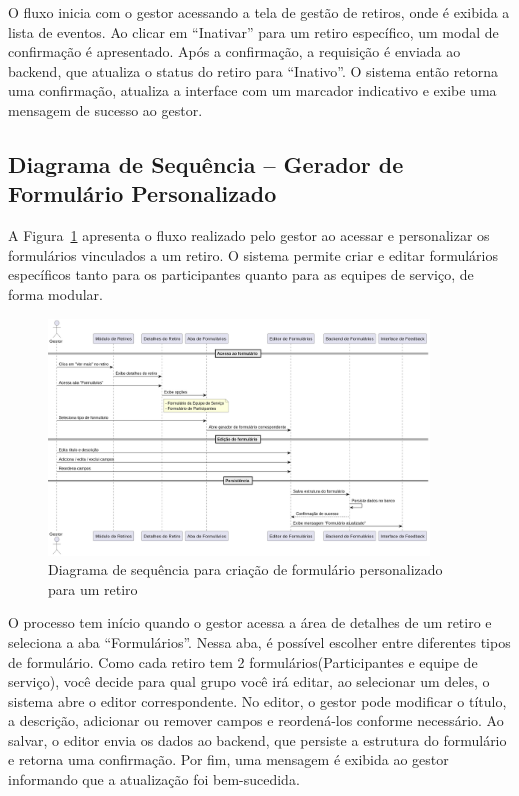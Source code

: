 O fluxo inicia com o gestor acessando a tela de gestão de retiros, onde é exibida a lista de eventos. Ao clicar em “Inativar” para um retiro específico, um modal de confirmação é apresentado. Após a confirmação, a requisição é enviada ao backend, que atualiza o status do retiro para “Inativo”. O sistema então retorna uma confirmação, atualiza a interface com um marcador indicativo e exibe uma mensagem de sucesso ao gestor.

\subsection{Diagrama de Sequência – Gerador de Formulário Personalizado}

A Figura~\ref{fig:retreatFormCreate} apresenta o fluxo realizado pelo gestor ao acessar e personalizar os formulários vinculados a um retiro. O sistema permite criar e editar formulários específicos tanto para os participantes quanto para as equipes de serviço, de forma modular.

\begin{figure}[H]
    \centering
    \includegraphics[width=0.9\textwidth]{images/diagramasdesequencias/retreatFormCreate.png}
    \caption{Diagrama de sequência para criação de formulário personalizado para um retiro}
    \label{fig:retreatFormCreate}
\end{figure}

O processo tem início quando o gestor acessa a área de detalhes de um retiro e seleciona a aba “Formulários”. Nessa aba, é possível escolher entre diferentes tipos de formulário. Como cada retiro tem 2 formulários(Participantes e equipe de serviço), você decide para qual grupo você irá editar, ao selecionar um deles, o sistema abre o editor correspondente. No editor, o gestor pode modificar o título, a descrição, adicionar ou remover campos e reordená-los conforme necessário. Ao salvar, o editor envia os dados ao backend, que persiste a estrutura do formulário e retorna uma confirmação. Por fim, uma mensagem é exibida ao gestor informando que a atualização foi bem-sucedida.

